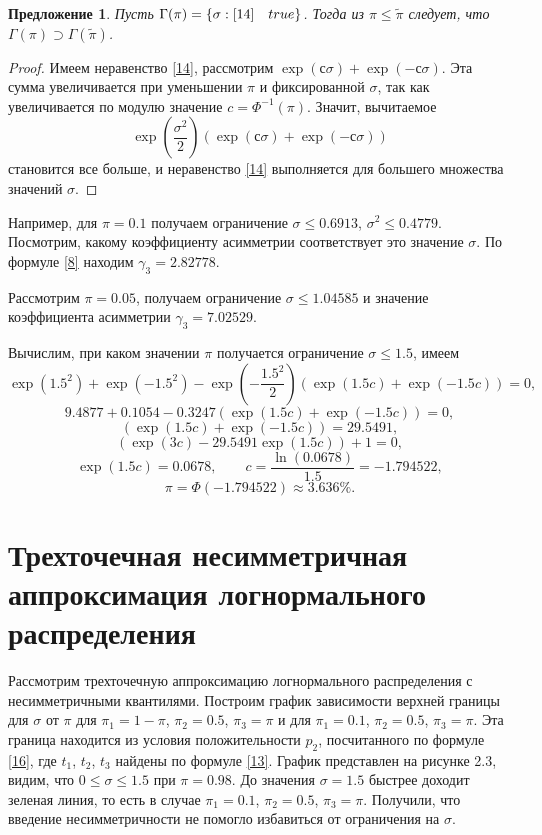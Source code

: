 \documentclass[specialist, substylefile = spbu.rtx,
subf,href,colorlinks=true, 12pt]{disser}
\newtheorem{proposition}[theorem]{Предложение}
\begin{document}
	\begin{proposition}\label{pr6}
		Пусть $\Gamma(\pi) = \left\lbrace \sigma: \eqref{14} \quad true \right\rbrace$. Тогда из $\pi \leq \tilde{\pi}$ следует, что $\Gamma(\pi)\supset \Gamma(\tilde{\pi})$.
	\end{proposition}
	\begin{proof}
		Имеем неравенство \eqref{14}, рассмотрим $\exp(с\sigma)+\exp(-с\sigma)$.
		Эта сумма увеличивается при уменьшении $\pi$ и фиксированной $\sigma$, так как увеличивается по модулю значение $c = \Phi^{-1}(\pi)$.
		Значит, вычитаемое
		\[\exp\left( \dfrac{\sigma^{2}}{2}\right)\left(\exp(с\sigma)+\exp(-с\sigma)\right)\]
		становится все больше, и неравенство \eqref{14} выполняется для большего множества значений $\sigma$.
	\end{proof}
	
	Например, для $\pi=0.1$ получаем ограничение $\sigma\leq 0.6913$, $\sigma^{2}\leq 0.4779$.
	Посмотрим, какому коэффициенту асимметрии соответствует это значение $\sigma$. По формуле \eqref{8} находим $\gamma_{3} = 2.82778$.
	
	Рассмотрим $\pi = 0.05$, получаем ограничение $\sigma \leq 1.04585$ и значение коэффициента асимметрии $\gamma_{3} = 7.02529$.
	
	Вычислим, при каком значении $\pi$ получается ограничение $\sigma \leq 1.5$, имеем
	\[\exp(1.5^{2})+\exp(-1.5^{2})-\exp\left( -\dfrac{1.5^{2}}{2}\right) (\exp(1.5c)+\exp(-1.5c)) = 0,\]
	\[9.4877+0.1054-0.3247(\exp(1.5c)+\exp(-1.5c))=0,\]
	\[(\exp(1.5c)+\exp(-1.5c))=29.5491,\]
	\[(\exp(3c)-29.5491\exp(1.5c))+1=0,\]
	\[\exp(1.5c)=0.0678, \quad\quad c=\dfrac{\ln(0.0678)}{1.5}=-1.794522,\]
	\[\pi=\Phi(-1.794522) \approx 3.636\%.\]
	
	\section{Трехточечная несимметричная аппроксимация логнормального распределения}
	
	Рассмотрим трехточечную аппроксимацию логнормального распределения с несимметричными квантилями.
	Построим график зависимости верхней границы для $\sigma$ от $\pi$ для $\pi_{1} = 1-\pi$, $\pi_{2} = 0.5$, $\pi_{3} = \pi$ и для $\pi_{1} = 0.1$, $\pi_{2} = 0.5$, $\pi_{3} = \pi$. Эта граница находится из условия положительности $p_{2}$, посчитанного по формуле \eqref{16}, где $t_{1}$, $t_{2}$, $t_{3}$ найдены по формуле \eqref{13}. График представлен на рисунке 2.3, видим, что $0 \leq \sigma \leq 1.5$ при $\pi = 0.98$. До значения $\sigma = 1.5$ быстрее доходит зеленая линия, то есть в случае $\pi_{1} = 0.1$, $\pi_{2} = 0.5$, $\pi_{3} = \pi$. Получили, что введение несимметричности не помогло избавиться от ограничения на $\sigma$.
	
\end{document}
